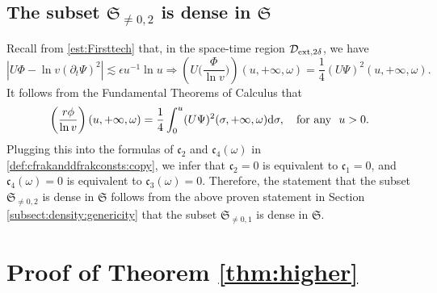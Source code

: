 \documentclass[a4paper,reqno]{amsart}
\theoremstyle{definition}
\numberwithin{equation}{section}
\def \d {{\rm{d}}}
\def \pt{\partial_{t}}
\def\ep{\epsilon}
\def\Sfrak{\mathfrak{S}}
\begin{document}
\subsection{The subset $\Sfrak_{\neq 0, 2}$ is dense in $\Sfrak$}
\label{subsect:density:genericity:G2neq0}

Recall from \eqref{est:Firsttech} that, in the space-time region $\mathcal{D}_{\rm{ext},2\delta}$, we have
\begin{equation*}
\left|U\Phi-\ln v \left(\pt \Psi\right)^{2}\right|\lesssim \ep u^{-1}\ln u\Longrightarrow \left(U\bigg(\frac{\Phi}{\ln v}\bigg)\right)(u,+\infty,\omega)= \frac{1}{4}(U \Psi)^2(u,+\infty,\omega).
\end{equation*}
It follows from the Fundamental Theorems of Calculus that
\begin{equation*}
\left(\frac{r\phi}{\ln v}\right){(u,+\infty, \omega)}= \frac{1}{4}\int_{0}^{u}(U \Psi)^2(\sigma,+\infty,\omega)\d\sigma, \quad \mbox{for any} \ \ u>0.
\end{equation*}
Plugging this into the formulas of $\mathfrak{c}_2$ and $\mathfrak{c}_4(\omega)$ in \eqref{def:cfrakanddfrakconsts:copy}, we infer that $\mathfrak{c}_2=0$ is equivalent to  $\mathfrak{c}_1=0$, and  $\mathfrak{c}_4(\omega)=0$ is equivalent to $\mathfrak{c}_3(\omega)=0$. Therefore, the statement that the subset $\Sfrak_{\neq 0, 2}$ is dense in $\Sfrak$ follows from  the above proven statement in Section \ref{subsect:density:genericity} that the subset $\Sfrak_{\neq 0, 1}$ is dense in $\Sfrak$.

\section{Proof of Theorem \ref{thm:higher}}\label{sec:appendix}
\end{document}
